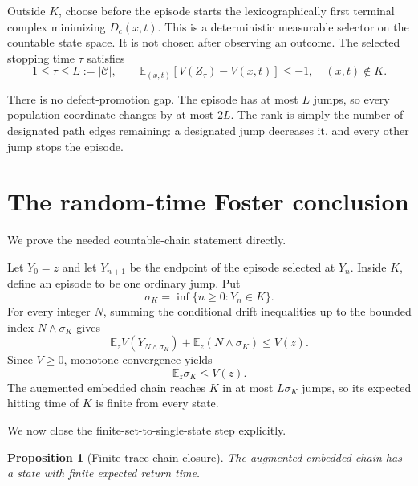 \documentclass[11pt]{article}
\newtheorem{proposition}[theorem]{Proposition}
\theoremstyle{definition}
\newcommand{\Ccal}{\mathcal C}
\newcommand{\E}{\mathbb E}
\begin{document}
Outside \(K\), choose before the episode starts the lexicographically first
terminal complex minimizing \(D_c(x,t)\).  This is a deterministic measurable
selector on the countable state space.  It is not chosen after observing an
outcome.  The selected stopping time \(\tau\) satisfies
\begin{equation}\label{eq:foster}
  1\leq\tau\leq L:=|\Ccal|,
  \qquad
  \E_{(x,t)}[V(Z_\tau)-V(x,t)]\leq-1,
  \quad (x,t)\notin K.
\end{equation}

There is no defect-promotion gap.  The episode has at most \(L\) jumps, so
every population coordinate changes by at most \(2L\).  The rank is simply
the number of designated path edges remaining: a designated jump decreases
it, and every other jump stops the episode.

\section{The random-time Foster conclusion}

We prove the needed countable-chain statement directly.

Let \(Y_0=z\) and let \(Y_{n+1}\) be the endpoint of the episode selected at
\(Y_n\).  Inside \(K\), define an episode to be one ordinary jump.  Put
\[
  \sigma_K=\inf\{n\geq0:Y_n\in K\}.
\]
For every integer \(N\), summing the conditional drift inequalities up to the
bounded index \(N\wedge\sigma_K\) gives
\begin{equation}\label{eq:episode-hit}
  \E_z V(Y_{N\wedge\sigma_K})
  +\E_z(N\wedge\sigma_K)
  \leq V(z).
\end{equation}
Since \(V\geq0\), monotone convergence yields
\begin{equation}\label{eq:mean-episodes}
  \E_z\sigma_K\leq V(z).
\end{equation}
The augmented embedded chain reaches \(K\) in at most \(L\sigma_K\) jumps,
so its expected hitting time of \(K\) is finite from every state.

We now close the finite-set-to-single-state step explicitly.

\begin{proposition}[Finite trace-chain closure]\label{prop:trace}
The augmented embedded chain has a state with finite expected return time.
\end{proposition}
\end{document}
